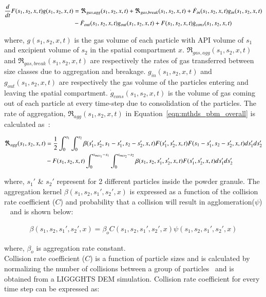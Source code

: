 \documentclass[preprint,11pt,authoryear]{elsarticle}
\begin{document}
\begin{align}
\frac{d}{dt}F(s_1,s_2,x,t)g(s_1,s_2,x,t)&= 
\Re_{gas,agg}(s_1,s_2,x,t)+\Re_{gas,break}(s_1,s_2,x,t)+\dot{F}_{in}(s_1,s_2,x,t)g_{in}(s_1,s_2,x,t)\notag\\
&-\dot{F}_{out}(s_1,s_2,x,t)g_{out}(s_1,s_2,x,t)+F(s_1,s_2,x,t)\dot{g}_{cons}(s_1,s_2,x,t)
\label{eqn:mthds_pbm_gas_agg} 
\end{align}

where, $g(s_1,s_2,x,t)$ is the gas volume of each particle with API volume of $s_1$ and excipient 
volume of $s_2$ in the spatial compartment $x$. $\Re_{gas,agg}(s_1,s_2,x,t)$ and 
$\Re_{gas,break}(s_1,s_2,x,t)$ are respectively the rates of gas transferred between size classes due to 
aggregation and breakage. $g_{in}(s_1,s_2,x,t)$ and $g_{out}(s_1,s_2,x,t)$ are respectively the gas 
volume of the particles entering and leaving the spatial compartment. $\dot{g}_{cons}(s_1,s_2,x,t)$ is the 
volume of gas coming out of each particle at every time-step due to consolidation of the particles. 
The rate of aggregation, $\Re_{agg}(s_1,s_2,x,t)$ in Equation~\ref{eqn:mthds_pbm_overall} is 
calculated as~\citep{Chaturbedi2017}:

\begin{align}
\Re_{agg}(s_1,s_2,x,t)&= \frac{1}{2}\int _0^{s_1} \int_0^{s_2} 
\beta(s_1',s_2',s_1-s_1',s_2-s_2',x,t)F(s_1',s_2',x,t)F(s_1-s_1',s_2-s_2',x,t)ds_1'ds_2'\notag\\ 
&- F(s_1,s_2,x,t)\int _0^{s_{max_1}-s_1} \int_0^{s_{max_2}-s_2} 
\beta(s_1,s_2,s_1',s_2',x,t)F(s_1',s_2',x,t)ds_1'ds_2'
\end{align}


where, $s_1'$ \& $s_2'$ represent for 2 different particles inside the powder granule. 
The aggregation kernel $\beta(s_1,s_2, s_1',s_2',x)$ is expressed as a function of the collision 
rate coefficient ($C$) and probability that a collision will result in agglomeration($\psi$)
~\citep{ingram2004} and is shown below: 

\begin{align}
\beta(s_1,s_2,s_1',s_2',x) = \beta_oC(s_1,s_2,s_1',s_2',x)\psi(s_1,s_2,s_1',s_2',x)
\label{eqn:mthds_pbm_beta_kernal}
\end{align}

where, $\beta_o$ is aggregation rate constant.\\
Collision rate coefficient ($C$) is a function of particle sizes and is calculated by normalizing the 
number of collisions between a group of particles~\citep{gantt2006} and is obtained from a LIGGGHTS 
DEM simulation. Collision rate coefficient for every time step can be expressed as:
\end{document}
